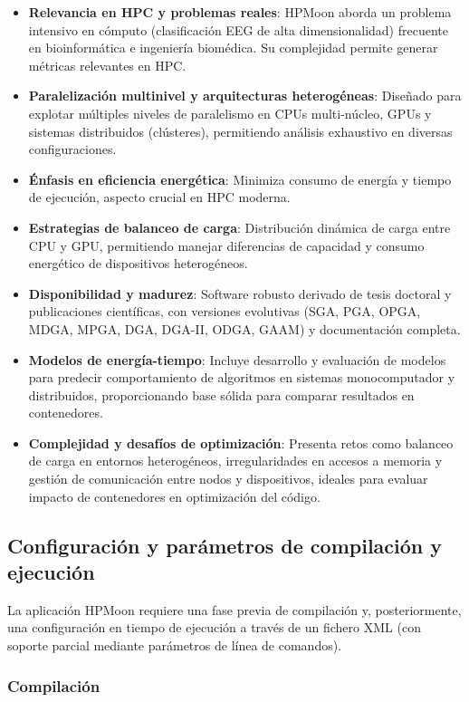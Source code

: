 \begin{itemize}
    \item \textbf{Relevancia en HPC y problemas reales}: HPMoon aborda un problema intensivo en cómputo (clasificación EEG de alta dimensionalidad) frecuente en bioinformática e ingeniería biomédica. Su complejidad permite generar métricas relevantes en HPC.
    \item \textbf{Paralelización multinivel y arquitecturas heterogéneas}: Diseñado para explotar múltiples niveles de paralelismo en CPUs multi-núcleo, GPUs y sistemas distribuidos (clústeres), permitiendo análisis exhaustivo en diversas configuraciones.
    \item \textbf{Énfasis en eficiencia energética}: Minimiza consumo de energía y tiempo de ejecución, aspecto crucial en HPC moderna.
    \item \textbf{Estrategias de balanceo de carga}: Distribución dinámica de carga entre CPU y GPU, permitiendo manejar diferencias de capacidad y consumo energético de dispositivos heterogéneos.
    \item \textbf{Disponibilidad y madurez}: Software robusto derivado de tesis doctoral y publicaciones científicas, con versiones evolutivas (SGA, PGA, OPGA, MDGA, MPGA, DGA, DGA-II, ODGA, GAAM) y documentación completa.
    \item \textbf{Modelos de energía-tiempo}: Incluye desarrollo y evaluación de modelos para predecir comportamiento de algoritmos en sistemas monocomputador y distribuidos, proporcionando base sólida para comparar resultados en contenedores.
    \item \textbf{Complejidad y desafíos de optimización}: Presenta retos como balanceo de carga en entornos heterogéneos, irregularidades en accesos a memoria y gestión de comunicación entre nodos y dispositivos, ideales para evaluar impacto de contenedores en optimización del código.
\end{itemize}

\subsection{Configuración y parámetros de compilación y ejecución}\label{subsec:hpm_configuracion}

La aplicación HPMoon requiere una fase previa de compilación y, posteriormente, una configuración en tiempo de ejecución a través de un fichero XML (con soporte parcial mediante parámetros de línea de comandos).

\subsubsection{Compilación}

